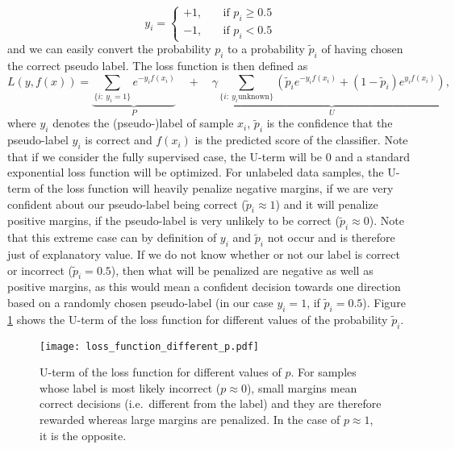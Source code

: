 \begin{equation*}
 y_i = 
    \begin{cases}
	+1, \quad & \text{if } p_i \geq 0.5 \\
	-1, \quad & \text{if } p_i < 0.5
      \end{cases}
\end{equation*}
and we can easily convert the probability $p_i$ to a probability $\tilde p_i$ of having chosen the correct pseudo label. 
The loss function is then defined as
\begin{equation*}
L(y,f(x)) = \underbrace{\sum_{\{i :~ y_i = 1\}} e^{-y_i f(x_i)}}_{P} \quad + \quad \gamma\underbrace{\sum_{\{i:~ y_i \text{unknown}\}} \left( \tilde p_i e^{-y_i f(x_i)} + (1-\tilde p_i) e^{y_i f(x_i)}\right)}_{U}, 
\end{equation*}
where $y_i$ denotes the (pseudo-)label of sample $x_i$, $\tilde p_i$ is the confidence that the pseudo-label $y_i$ is correct and $f(x_i)$ is the predicted score of the classifier.
Note that if we consider the fully supervised case, the U-term will be 0 and a standard exponential loss function will be optimized. 
For unlabeled data samples, the U-term of the loss function will heavily penalize negative margins, if we are very confident about our pseudo-label being correct ($\tilde p_i \approx 1$) and it will penalize positive margins, if the pseudo-label is very unlikely to be correct ($\tilde p_i \approx 0$). 
Note that this extreme case can by definition of $y_i$ and $\tilde p_i$ not occur and is therefore just of explanatory value. 
If we do not know whether or not our label is correct or incorrect ($\tilde p_i = 0.5$), then what will be penalized are negative as well as positive margins, as this would mean a confident decision towards one direction based on a randomly chosen pseudo-label (in our case $y_i = 1$, if $\tilde p_i=0.5$). Figure \ref{fig:ourlossfunctionplot} shows the U-term of the loss function for different values of the probability $\tilde p_i$.

\begin{figure}[ht]
  \centering
  \texttt{[image: loss\_function\_different\_p.pdf]}	
  \caption{U-term of the loss function for different values of $p$. For samples whose label is most likely incorrect ($p \approx 0$), small margins mean correct decisions (i.e.\ different from the label) and they are therefore rewarded whereas large margins are penalized. In the case of $p \approx 1$, it is the opposite.}
  \label{fig:ourlossfunctionplot}
\end{figure}

